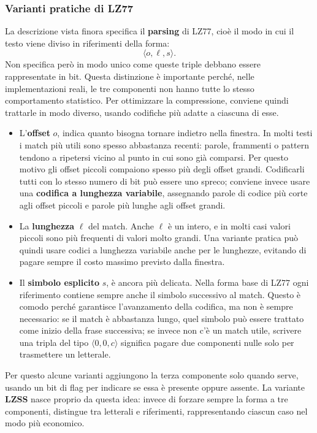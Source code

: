 \documentclass{article}
\theoremstyle{definition}
\numberwithin{equation}{section}
\begin{document}
\subsubsection{Varianti pratiche di LZ77}
La descrizione vista finora specifica il \textbf{parsing} di LZ77, cioè il modo in cui il testo viene diviso in riferimenti della forma:
\[
    \langle o,\ell,s\rangle.
\]
Non specifica però in modo unico come queste triple debbano essere rappresentate in bit. Questa distinzione è importante perché, nelle implementazioni reali, le tre componenti non hanno tutte lo stesso comportamento statistico. Per ottimizzare la compressione, conviene quindi trattarle in modo diverso, usando codifiche più adatte a ciascuna di esse.
\begin{itemize}
    \item L'\textbf{offset} $o$, indica quanto bisogna tornare indietro nella finestra. In molti testi i match più utili sono spesso abbastanza recenti: parole, frammenti o pattern tendono a ripetersi vicino al punto in cui sono già comparsi. Per questo motivo gli offset piccoli compaiono spesso più degli offset grandi. Codificarli tutti con lo stesso numero di bit può essere uno spreco; conviene invece usare una \textbf{codifica a lunghezza variabile}, assegnando parole di codice più corte agli offset piccoli e parole più lunghe agli offset grandi.
    \item La \textbf{lunghezza} $\ell$ del match. Anche $\ell$ è un intero, e in molti casi valori piccoli sono più frequenti di valori molto grandi. Una variante pratica può quindi usare codici a lunghezza variabile anche per le lunghezze, evitando di pagare sempre il costo massimo previsto dalla finestra.
    \item Il \textbf{simbolo esplicito} $s$, è ancora più delicata. Nella forma base di LZ77 ogni riferimento contiene sempre anche il simbolo successivo al match. Questo è comodo perché garantisce l'avanzamento della codifica, ma non è sempre necessario: se il match è abbastanza lungo, quel simbolo può essere trattato come inizio della frase successiva; se invece non c'è un match utile, scrivere una tripla del tipo $\langle 0,0,c\rangle$ significa pagare due componenti nulle solo per trasmettere un letterale.
\end{itemize}

Per questo alcune varianti aggiungono la terza componente solo quando serve, usando un bit di flag per indicare se essa è presente oppure assente. La variante \textbf{LZSS} nasce proprio da questa idea: invece di forzare sempre la forma a tre componenti, distingue tra letterali e riferimenti, rappresentando ciascun caso nel modo più economico.
\end{document}
